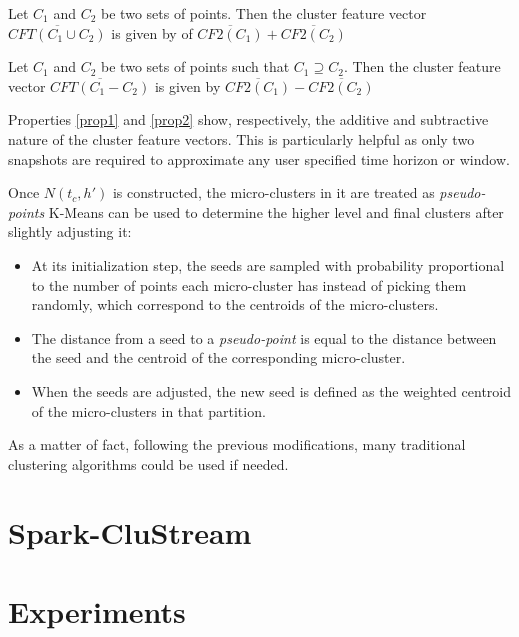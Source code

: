 \documentclass{llncs}
\begin{document}
\begin{property}\label{prop1}
 Let $C_1$ and $C_2$ be two sets of points. Then the cluster feature vector $\overline{CFT(C_1 \cup C_2)}$ is given by of $\overline{CF2(C_1)} + \overline{CF2(C_2)}$
\end{property}

\begin{property}\label{prop2}
 Let $C_1$ and $C_2$ be two sets of points such that $C_1 \supseteq C_2$. Then the cluster feature vector $\overline{CFT(C_1 - C_2)}$ is given by $\overline{CF2(C_1)} - \overline{CF2(C_2)}$
\end{property}

Properties \ref{prop1} and \ref{prop2} show, respectively, the additive and subtractive nature of the cluster feature vectors. This is particularly helpful as only two snapshots are required to approximate any user specified time horizon or window.

Once $N(t_c,h')$ is constructed, the micro-clusters in it are treated as \textit{pseudo-points} K-Means can be used to determine the higher level and final clusters after slightly adjusting it:

\begin{itemize}
 \item At its initialization step, the seeds are sampled with probability proportional to the number of points each micro-cluster has instead of picking them randomly, which correspond to the centroids of the micro-clusters.
 \item The distance from a seed to a \textit{pseudo-point} is equal to the distance between the seed and the centroid of the corresponding micro-cluster.
 \item When the seeds are adjusted, the new seed is defined as the weighted centroid of the micro-clusters in that partition.
\end{itemize}

As a matter of fact, following the previous modifications, many traditional clustering algorithms could be used if needed.


\section{Spark-CluStream}


\section{Experiments}
\end{document}
